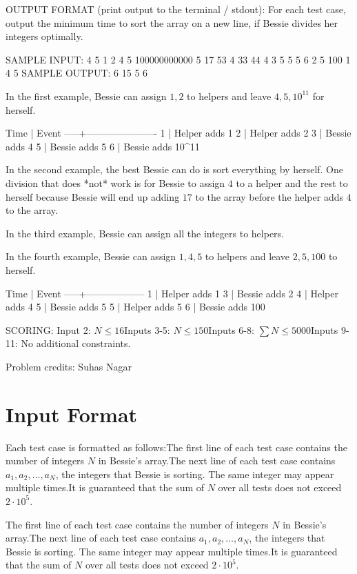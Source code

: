 \documentclass[12pt]{article}
\begin{document}
OUTPUT FORMAT (print output to the terminal / stdout):
For each test case, output the minimum time to sort the array on a new line, if
Bessie divides her integers optimally.

SAMPLE INPUT:
4
5
1 2 4 5 100000000000
5
17 53 4 33 44
4
3 5 5 5
6
2 5 100 1 4 5
SAMPLE OUTPUT: 
6
15
5
6

In the first example, Bessie can assign $1,2$ to helpers and leave $4,5,10^{11}$
for herself. 


Time | Event
-----+----------------------
1    | Helper adds 1
2    | Helper adds 2
3    | Bessie adds 4
5    | Bessie adds 5
6    | Bessie adds 10^{11}

In the second example, the best Bessie can do is sort everything by herself. One
division that does *not* work is for Bessie to assign $4$ to a helper and the
rest to herself because Bessie will end up adding $17$ to the array before the
helper adds $4$ to the array.

In the third example, Bessie can assign all the integers to helpers.

In the fourth example, Bessie can assign $1,4,5$ to helpers and leave $2,5,100$
to herself.


Time | Event
-----+------------------
1    | Helper adds 1
3    | Bessie adds 2
4    | Helper adds 4
5    | Bessie adds 5
5    | Helper adds 5
6    | Bessie adds 100

SCORING:
Input 2: $N\le 16$Inputs 3-5: $N\le 150$Inputs 6-8: $\sum N\le 5000$Inputs 9-11: No additional constraints.


Problem credits: Suhas Nagar



\section*{Input Format}
Each test case is formatted as follows:The first line of each test case contains the number of integers $N$ in Bessie's
array.The next line of each test case contains $a_1, a_2, \dots, a_N$, the integers
that Bessie is sorting. The same integer may appear multiple times.It is guaranteed that the sum of $N$ over all tests does not exceed
$2\cdot 10^5$.

The first line of each test case contains the number of integers $N$ in Bessie's
array.The next line of each test case contains $a_1, a_2, \dots, a_N$, the integers
that Bessie is sorting. The same integer may appear multiple times.It is guaranteed that the sum of $N$ over all tests does not exceed
$2\cdot 10^5$.
\end{document}
